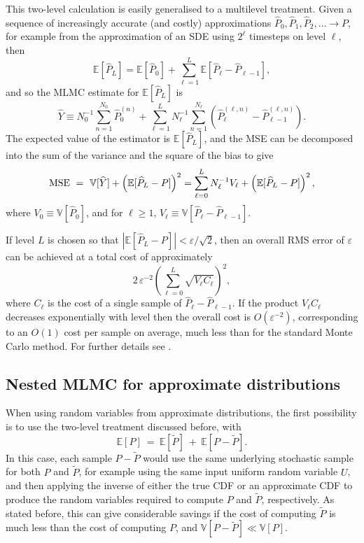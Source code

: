 \documentclass[review]{siamart190516}
\def \EE {{\mathbb{E}}}
\def \VV {{\mathbb{V}}}
\def \tP {{\widetilde{P}}}
\def \hP {{\widehat{P}}}
\def \hY {{\widehat{Y}}}
\def\eps{{\varepsilon}}
\begin{document}
This two-level calculation is easily generalised to a multilevel treatment.
Given a sequence of increasingly accurate (and costly) approximations 
$\hP_0, \hP_1, \hP_2, \ldots \longrightarrow P$, for example from the
approximation of an SDE using $2^\ell$ timesteps on level $\ell$, then
\[
\EE[ \hP_L ] = \EE[ \hP_0 ] + \sum_{\ell=1}^L \EE[ \hP_\ell {-} \hP_{\ell-1} ],
\]
and so the MLMC estimate for $\EE[\hP_L]$ is
\[
\hY \equiv N_0^{-1}  \sum_{n=1}^{N_0} \hP_0^{(n)} + 
\sum_{\ell=1}^L N_\ell^{-1}  \sum_{n=1}^{N_\ell} (\hP_\ell^{(\ell,n)} - \hP_{\ell-1}^{(\ell,n)}).
\]
The expected value of the estimator is $\EE[\hP_L]$, and the MSE
can be decomposed into the sum of the variance and the square of the bias
to give
\[
  {\rm MSE}\ =\  
  \VV[\hY] + \left( \EE[\hP_L - P] \right)^2
  = \sum_{\ell=0}^L N^{-1}_\ell V_\ell + \left( \EE[\hP_L - P] \right)^2,
\]
where $V_0\equiv\VV[\hP_0]$, and for $\ell\!\geq\!1$, 
$V_\ell \equiv \VV[\hP_\ell {-}\hP_{\ell-1}]$.

If level $L$ is chosen so that $|\EE[\hP_L - P]| \!<\! \eps/\sqrt{2}$, then
an overall RMS error of $\eps$ can be achieved at a total cost of approximately
\[
  2\, \eps^{-2} \left( \sum_{\ell=0}^L \sqrt{V_\ell C_\ell} \right)^2,
\]
where $C_\ell$ is the cost of a single sample of $\hP_\ell {-}\hP_{\ell-1}$.  
If the product $V_\ell C_\ell$ decreases exponentially with level then the overall 
cost is $O(\eps^{-2})$, corresponding to an $O(1)$ cost per sample on average, 
much less than for the standard Monte Carlo method.
For further details see \cite{giles08,giles15}.

\subsection{Nested MLMC for approximate distributions}

\label{sec:nested_MLMC}

When using random variables from approximate distributions, the first possibility is
to use the two-level treatment discussed before, with
\[
\EE[ P ]\ =\ \EE[ \tP ]\ +\ \EE[ P {-} \tP ].
\]
In this case, each sample $P {-} \tP$ would use the same underlying stochastic
sample for both $P$ and $\tP$, for example using the same input uniform random
variable $U$, and then applying the inverse of either the true CDF or an approximate CDF to
produce the random variables required to compute $P$ and $\tP$, respectively.
As stated before, this can give considerable savings if the cost of computing $\tP$
is much less than the cost of computing $P$, and $\VV[P{-}\tP] \ll \VV[P]$.
\end{document}
